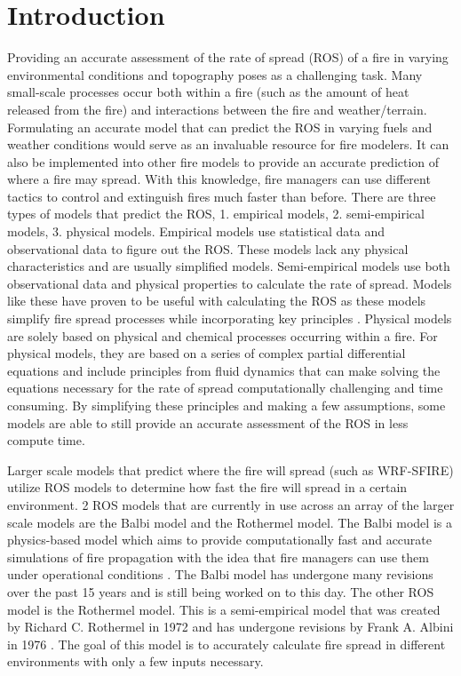\documentclass{article}
\begin{document}
\section{Introduction}
Providing an accurate assessment of the rate of spread (ROS) of a fire in varying environmental conditions and topography poses as a challenging task. Many small-scale processes occur both within a fire (such as the amount of heat released from the fire) and interactions between the fire and weather/terrain. Formulating an accurate model that can predict the ROS in varying fuels and weather conditions would serve as an invaluable resource for fire modelers. It can also be implemented into other fire models to provide an accurate prediction of where a fire may spread. With this knowledge, fire managers can use different tactics to control and extinguish fires much faster than before. There are three types of models that predict the ROS, 1. empirical models, 2. semi-empirical models, 3. physical models. Empirical models use statistical data and observational data to figure out the ROS. These models lack any physical characteristics and are usually simplified models. Semi-empirical models use both observational data and physical properties to calculate the rate of spread. Models like these have proven to be useful with calculating the ROS as these models simplify fire spread processes while incorporating key principles \citep{Chatelon2022}. Physical models are solely based on physical and chemical processes occurring within a fire. For physical models, they are based on a series of complex partial differential equations and include principles from fluid dynamics that can make solving the equations necessary for the rate of spread computationally challenging and time consuming. By simplifying these principles and making a few assumptions, some models are able to still provide an accurate assessment of the ROS in less compute time.

Larger scale models that predict where the fire will spread (such as WRF-SFIRE) utilize ROS models to determine how fast the fire will spread in a certain environment. 2 ROS models that are currently in use across an array of the larger scale models are the Balbi model and the Rothermel model. The Balbi model is a physics-based model which aims to provide computationally fast and accurate simulations of fire propagation with the idea that fire managers can use them under operational conditions \citep{Chatelon2022}. The Balbi model has undergone many revisions over the past 15 years and is still being worked on to this day. The other ROS model is the Rothermel model. This is a semi-empirical model that was created by Richard C. Rothermel in 1972 and has undergone revisions by Frank A. Albini in 1976 \citep{Anderson2010}. The goal of this model is to accurately calculate fire spread in different environments with only a few inputs necessary.
\end{document}
